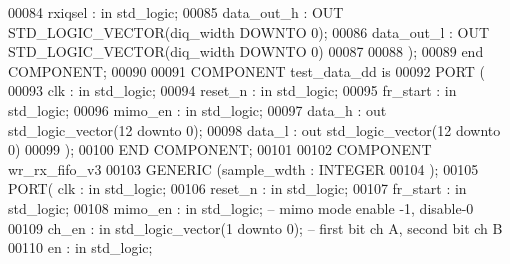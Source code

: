 \begin{DoxyCode}
00084         rxiqsel         : \textcolor{keywordflow}{in} \textcolor{comment}{std\_logic};
00085         data_out_h      : \textcolor{keywordflow}{OUT} \textcolor{comment}{STD\_LOGIC\_VECTOR}(diq_width \textcolor{keywordflow}{DOWNTO} \textcolor{vhdllogic}{}\textcolor{vhdllogic}{0});
00086         data_out_l      : \textcolor{keywordflow}{OUT} \textcolor{comment}{STD\_LOGIC\_VECTOR}(diq_width \textcolor{keywordflow}{DOWNTO} \textcolor{vhdllogic}{}\textcolor{vhdllogic}{0})
00087 
00088         );
00089 \textcolor{keywordflow}{end} \textcolor{keywordflow}{COMPONENT};
00090 
00091 \textcolor{keywordflow}{COMPONENT} test_data_dd \textcolor{keywordflow}{is}
00092   \textcolor{keywordflow}{PORT} (
00093             clk             : \textcolor{keywordflow}{in} \textcolor{comment}{std\_logic};
00094             reset_n         : \textcolor{keywordflow}{in} \textcolor{comment}{std\_logic};
00095             fr_start            : \textcolor{keywordflow}{in} \textcolor{comment}{std\_logic};
00096             mimo_en         : \textcolor{keywordflow}{in} \textcolor{comment}{std\_logic};
00097             data_h          : \textcolor{keywordflow}{out} \textcolor{comment}{std\_logic\_vector}(\textcolor{vhdllogic}{}\textcolor{vhdllogic}{12} \textcolor{keywordflow}{downto} \textcolor{vhdllogic}{}\textcolor{vhdllogic}{0});
00098             data_l          : \textcolor{keywordflow}{out} \textcolor{comment}{std\_logic\_vector}(\textcolor{vhdllogic}{}\textcolor{vhdllogic}{12} \textcolor{keywordflow}{downto} \textcolor{vhdllogic}{}\textcolor{vhdllogic}{0})
00099         );
00100 \textcolor{keywordflow}{END} \textcolor{keywordflow}{COMPONENT};
00101 
00102 \textcolor{keywordflow}{COMPONENT} wr_rx_fifo_v3
00103 \textcolor{keywordflow}{GENERIC} (sample_wdth : \textcolor{comment}{INTEGER}
00104             );
00105     \textcolor{keywordflow}{PORT}(   clk         : \textcolor{keywordflow}{in} \textcolor{comment}{std\_logic};
00106             reset_n     : \textcolor{keywordflow}{in} \textcolor{comment}{std\_logic};
00107             fr_start        : \textcolor{keywordflow}{in} \textcolor{comment}{std\_logic};
00108             mimo_en     : \textcolor{keywordflow}{in} \textcolor{comment}{std\_logic}; \textcolor{keyword}{-- mimo mode enable -1, disable-0}
00109             ch_en           : \textcolor{keywordflow}{in} \textcolor{comment}{std\_logic\_vector}(\textcolor{vhdllogic}{}\textcolor{vhdllogic}{1} \textcolor{keywordflow}{downto} \textcolor{vhdllogic}{}\textcolor{vhdllogic}{0}); \textcolor{keyword}{-- first bit ch A, second bit ch B}
00110             en              : \textcolor{keywordflow}{in} \textcolor{comment}{std\_logic};

\end{DoxyCode}
